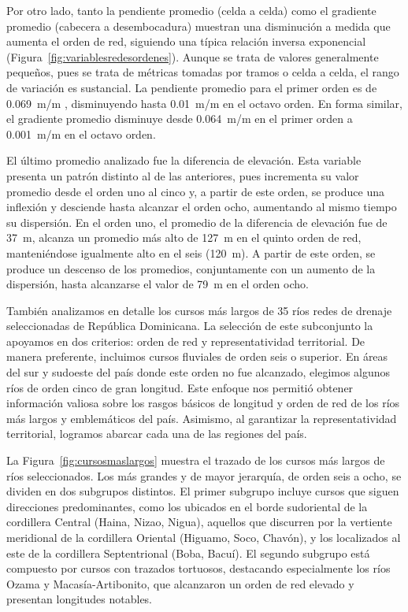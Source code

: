 \documentclass[spanish]{article}
\begin{document}
Por otro lado, tanto la pendiente promedio (celda a celda) como el
gradiente promedio (cabecera a desembocadura) muestran una disminución a
medida que aumenta el orden de red, siguiendo una típica relación
inversa exponencial (Figura~\ref{fig:variablesredesordenes}). Aunque se
trata de valores generalmente pequeños, pues se trata de métricas
tomadas por tramos o celda a celda, el rango de variación es sustancial.
La pendiente promedio para el primer orden es de 0.069~m/m ,
disminuyendo hasta 0.01~m/m en el octavo orden. En forma similar, el
gradiente promedio disminuye desde 0.064~m/m en el primer orden a
0.001~m/m en el octavo orden.

El último promedio analizado fue la diferencia de elevación. Esta
variable presenta un patrón distinto al de las anteriores, pues
incrementa su valor promedio desde el orden uno al cinco y, a partir de
este orden, se produce una inflexión y desciende hasta alcanzar el orden
ocho, aumentando al mismo tiempo su dispersión. En el orden uno, el
promedio de la diferencia de elevación fue de 37~m, alcanza un promedio
más alto de 127~m en el quinto orden de red, manteniéndose igualmente
alto en el seis (120~m). A partir de este orden, se produce un descenso
de los promedios, conjuntamente con un aumento de la dispersión, hasta
alcanzarse el valor de 79~m en el orden ocho.

También analizamos en detalle los cursos más largos de 35 ríos redes de
drenaje seleccionadas de República Dominicana. La selección de este
subconjunto la apoyamos en dos criterios: orden de red y
representatividad territorial. De manera preferente, incluimos cursos
fluviales de orden seis o superior. En áreas del sur y sudoeste del país
donde este orden no fue alcanzado, elegimos algunos ríos de orden cinco
de gran longitud. Este enfoque nos permitió obtener información valiosa
sobre los rasgos básicos de longitud y orden de red de los ríos más
largos y emblemáticos del país. Asimismo, al garantizar la
representatividad territorial, logramos abarcar cada una de las regiones
del país.

La Figura~\ref{fig:cursosmaslargos} muestra el trazado de los cursos más
largos de ríos seleccionados. Los más grandes y de mayor jerarquía, de
orden seis a ocho, se dividen en dos subgrupos distintos. El primer
subgrupo incluye cursos que siguen direcciones predominantes, como los
ubicados en el borde sudoriental de la cordillera Central (Haina, Nizao,
Nigua), aquellos que discurren por la vertiente meridional de la
cordillera Oriental (Higuamo, Soco, Chavón), y los localizados al este
de la cordillera Septentrional (Boba, Bacuí). El segundo subgrupo está
compuesto por cursos con trazados tortuosos, destacando especialmente
los ríos Ozama y Macasía-Artibonito, que alcanzaron un orden de red
elevado y presentan longitudes notables.
\end{document}
